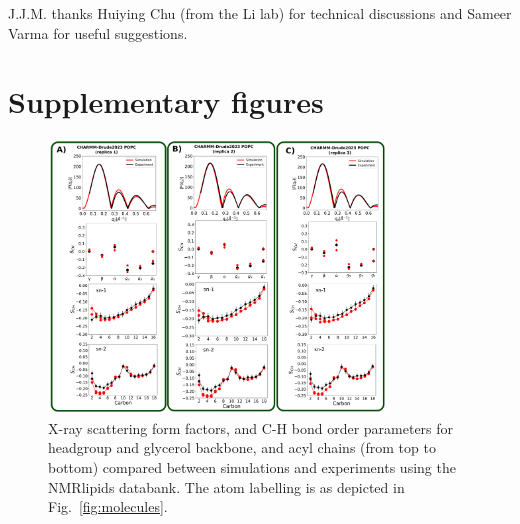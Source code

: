 \documentclass[journal=jacsat,manuscript=article,layout=singlecolumn]{achemso}
\begin{document}
\begin{acknowledgement}

J.J.M. thanks Huiying Chu (from the Li lab) for technical discussions and Sameer Varma for useful suggestions.

\end{acknowledgement}

\begin{suppinfo}
\end{suppinfo}




\section{Supplementary figures}

\begin{figure}[!h]
    \centering
    \includegraphics[width=0.8\textwidth]{Figures/quality_Drude2023_replicas.pdf}
    \caption{X-ray scattering form factors, and C-H bond order parameters for headgroup and glycerol backbone, and acyl chains (from top to bottom) compared between simulations and experiments using the NMRlipids databank. The atom labelling is as depicted in Fig.~\ref{fig:molecules}.}
    \label{fig:order_parameters_replicas}

\end{figure}
\end{document}
